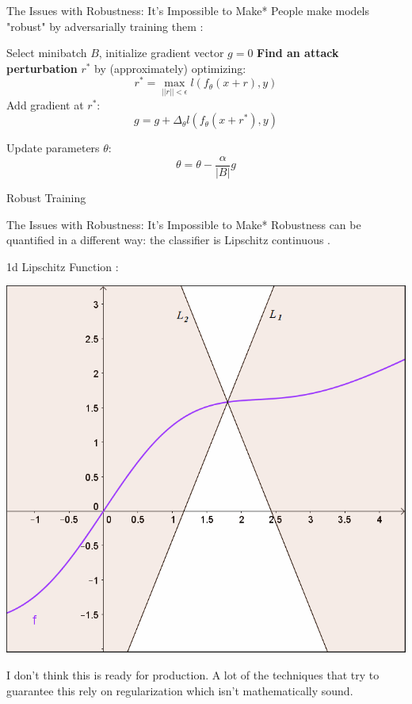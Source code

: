 \documentclass{beamer}
\begin{document}
\begin{frame}{The Issues with Robustness: It's Impossible to Make*}
    People make models "robust" by adversarially training them \cite{adv_training}:

    \begin{algorithm}[H]
        \begin{algorithmic}[1]
            \STATE Select minibatch $B$, initialize gradient vector $g = 0$
                \STATE \textbf<2>{Find an attack perturbation} $r^*$ by (approximately) optimizing: $$ r^* = \max_{||r|| < \epsilon} l(f_\theta (x+r), y) $$
                \STATE Add gradient at $r^*$: $$g = g + \Delta_\theta l(f_\theta(x+ r^*), y)$$
            \ENDFOR


        \STATE Update parameters $\theta$: $$\theta = \theta - \frac{\alpha}{|B|}g$$
        \end{algorithmic}
        \caption{Robust Training}
        \label{alg:seq}
    \end{algorithm}
\end{frame}

\begin{frame}{The Issues with Robustness: It's Impossible to Make*}
    Robustness can be quantified in a different way: the classifier is Lipschitz continuous \cite{Lipschitz_robustness}.
    \begin{center}
        1d Lipschitz Function \cite{Lipschitz_diagram}:

        \includegraphics[scale=0.25]{lipschitz_diagram.png}

        I don't think this is ready for production. A lot of the techniques that try to guarantee this rely on regularization which isn't mathematically sound.
    \end{center}
\end{frame}
\end{document}
